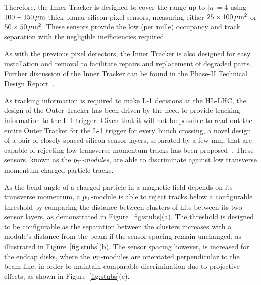 Therefore, the Inner Tracker is designed to cover the range up to $|\eta| = 4$ using $100-150\,\mu\text{m}$ thick planar silicon pixel sensors, measuring either $25\times100\,\mu\text{m}^{2}$ or $50\times50\,\mu\text{m}^{2}$.
These sensors provide the low (per mille) occupancy and track separation with the negligible inefficiencies required.

As with the previous pixel detectors, the Inner Tracker is also designed for easy installation and removal to facilitate repairs and replacement of degraded parts.
Further discussion of the Inner Tracker can be found in the Phase-II Technical Design Report~\cite{P2TrackerTDR}.

As tracking information is required to make L-1 decisions at the HL-LHC, the design of the Outer Tracker has been driven by the need to provide tracking information to the L-1 trigger.
Given that it will not be possible to read out the entire Outer Tracker for the L-1 trigger for every bunch crossing, a novel design of a pair of closely-spaced silicon sensor layers, separated by a few mm, that are capable of rejecting low transverse momentum tracks has been proposed~\cite{jjonespixel,markthesis}.
These sensors, known as the \emph{$p_{\mathrm{T}}$-modules}, are able to discriminate against low transverse momentum charged particle tracks.

As the bend angle of a charged particle in a magnetic field depends on its transverse momentum, a $p_{\mathrm{T}}$-module is able to  reject tracks below a configurable \pT threshold by comparing the distance between clusters of hits between its two sensor layers, as demonstrated in Figure~\ref{fig:stubs}(a).
The \pT threshold is designed to be configurable as the separation between the clusters increases with a module's distance from the beam if the sensor spacing remain unchanged, as illustrated in Figure~\ref{fig:stubs}(b).
The sensor spacing however, is increased for the endcap disks, where the $p_{\mathrm{T}}$-modules are orientated perpendicular to the beam line, in order to maintain comparable discrimination due to projective effects, as shown in Figure~\ref{fig:stubs}(c).

